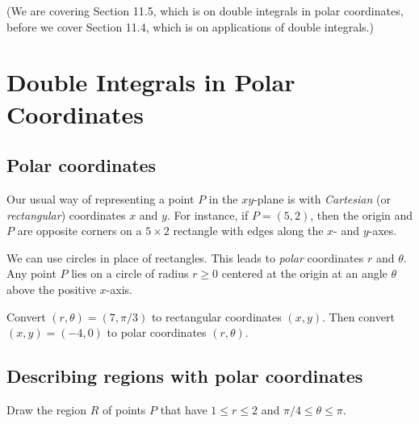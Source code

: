 \newlecture
\setcounter{chapter}{11}
\setcounter{section}{4}

\def\coursetopicnumber{III}
\def\topic{Double Integrals in Polar Coordinates} %
\def\shorttopic{Double integrals, polar coordinates} %
\def\textbookname{Active Calculus} %
\def\shorttextbookname{AC} %
\def\textbooksection{11.5} %
\def\textbooksectionurl{https://activecalculus.org/vector/S-11-5-Double-Integrals-Polar.html} %
\def\handoutday{} %


\thispagestyle{plain}
\topstuff
(We are covering Section 11.5, which is on double integrals in polar coordinates, before we cover Section 11.4, which is on applications of double integrals.)
\section{\topic{} \booklink{}}
\label{sec:double-int-polar}
\subsection{Polar coordinates}
Our usual way of representing a point $P$ in the $xy$-plane is with \emph{Cartesian} (or \emph{rectangular}) coordinates $x$ and $y$. For instance, if $P=(5,2)$, then the origin and $P$ are opposite corners on a $5\times2$ rectangle with edges along the $x$- and $y$-axes.
\vspace{1.5in}

We can use circles in place of rectangles. This leads to \emph{polar} coordinates $r$ and $\theta$. Any point $P$ lies on a circle of radius $r\ge0$ centered at the origin at an angle $\theta$ above the positive $x$-axis.

\vfill

\begin{ex}
    Convert $(r,\theta)=(7,\pi/3)$ to rectangular coordinates $(x,y)$. Then convert $(x,y)=(-4,0)$ to polar coordinates $(r,\theta)$.
\end{ex}

\vspace{1in}

\pagebreak 

\subsection{Describing regions with polar coordinates}
\begin{ex}
    Draw the region $R$ of points $P$ that have $1\le r\le 2$ and $\pi/4\le\theta\le \pi$.
\end{ex}

